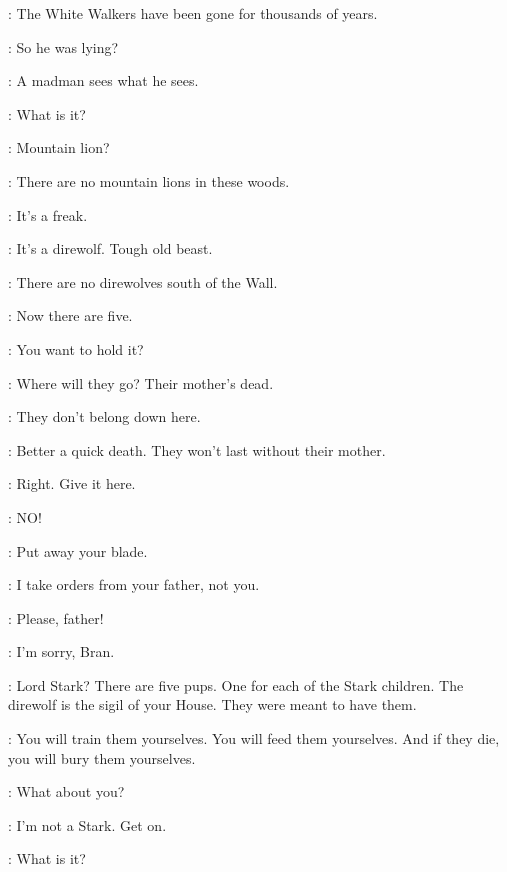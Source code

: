 \NED: The White Walkers have been gone for thousands of years. 

\BRAN: So he was lying? 

\NED: A madman sees what he sees. 


\JON: What is it? 

\THEON: Mountain lion? 

\NED: There are no mountain lions in these woods. 


\THEON: It's a freak. 

\NED: It's a direwolf. Tough old beast. 

\ROBB: There are no direwolves south of the Wall. 

\JON: Now there are five. 


\JON: You want to hold it? 

\BRAN: Where will they go? Their mother's dead. 

\RODRIK: They don't belong down here. 

\NED: Better a quick death. They won't last without their mother. 

\THEON: Right. Give it here. 

\BRAN: NO! 

\ROBB: Put away your blade. 

\THEON: I take orders from your father, not you. 

\BRAN: Please, father! 

\NED: I'm sorry, Bran. 

\JON: Lord Stark? There are five pups. One for each of the Stark children. The direwolf is the sigil of your House. They were meant to have them. 

\NED: You will train them yourselves. You will feed them yourselves. And if they die, you will bury them yourselves. 


\BRAN: What about you? 

\JON: I'm not a Stark. Get on. 


\ROBB: What is it? 

